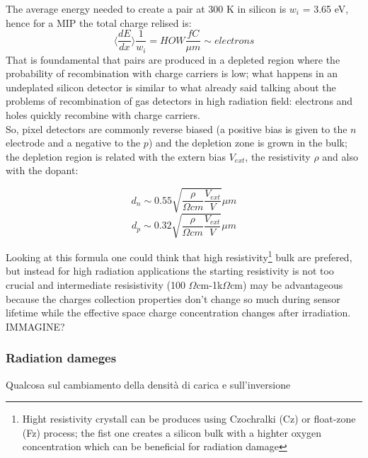\begin{titlepage}
The average energy needed to create a pair at 300 K in silicon is $w_i$ = 3.65 eV, hence for a MIP the total charge 
relised is: 
\begin{equation}
   \langle \frac{dE}{dx}\rangle \frac{1}{w_i} = HOW \frac{fC}{\mu m} \sim electrons
\end{equation}
That is foundamental that pairs are produced in a depleted region where the probability
of recombination with charge carriers is low; what happens in an undeplated silicon detector
is similar to what already said talking about the problems of recombination of gas detectors 
in high radiation field: electrons and holes quickly recombine with charge carriers.\\
So, pixel detectors are commonly reverse biased (a positive bias is given 
to the $n$ electrode and a negative to the $p$) and the depletion zone is grown in the bulk; 
the depletion region is related with the extern bias $V_{ext}$, the resistivity $\rho$ and also
with the dopant:
\begin{multicols}{2}
\begin{equation}
   d_{n} \sim 0.55 \sqrt{\frac{\rho}{\Omega cm}\frac{V_{ext}}{V}} \mu m 
\end{equation}\break
\begin{equation}
   d_{p} \sim 0.32 \sqrt{\frac{\rho}{\Omega cm}\frac{V_{ext}}{V}} \mu m
\end{equation}
\label{eq:deplation_d}
\end{multicols}
Looking at this formula one could think that high resistivity\footnote{Hight resistivity
crystall can be produces using Czochralki (Cz) or float-zone (Fz) process;
the fist one creates a silicon bulk with a highter oxygen concentration
which can be beneficial for radiation damage} bulk are prefered, but
instead for high radiation applications the starting resistivity is not too crucial
and intermediate resisistivity (100 $\Omega$cm-1k$\Omega$cm) may be advantageous 
because the charges collection properties don't  change so much during sensor lifetime 
while the effective space charge concentration changes after irradiation. IMMAGINE?\\

\subsubsection{Radiation dameges}
Qualcosa sul cambiamento della densità di carica e sull'inversione



\end{titlepage}
